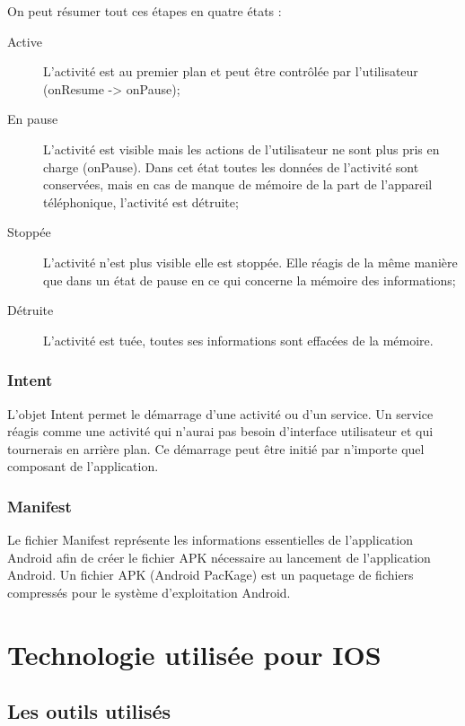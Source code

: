 On peut résumer tout ces étapes en quatre états :
\begin{description}
	\item[Active] L'activité est au premier plan et peut être contrôlée par l'utilisateur (onResume -> onPause);
	\item[En pause] L'activité est visible mais les actions de l'utilisateur ne sont plus pris en charge (onPause). Dans cet état toutes les données de l'activité sont conservées, mais en cas de manque de mémoire de la part de l'appareil téléphonique, l'activité est détruite;
	\item[Stoppée] L'activité n'est plus visible elle est stoppée. Elle réagis de la même manière que dans un état de pause en ce qui concerne la mémoire des informations;
	\item[Détruite] L'activité est tuée, toutes ses informations sont effacées de la mémoire.
\end{description}

\subsubsection{Intent}

L'objet Intent permet le démarrage d'une activité ou d'un service. Un service réagis comme une activité qui n'aurai pas besoin d'interface utilisateur et qui tournerais en arrière plan. Ce démarrage peut être initié par n'importe quel composant de l'application.

\subsubsection{Manifest}
Le fichier Manifest représente les informations essentielles de l'application Android afin de créer le fichier APK nécessaire au lancement de l'application Android. Un fichier APK (Android PacKage) est un paquetage de fichiers compressés pour le système d'exploitation Android.

\section{Technologie utilisée pour IOS}

\subsection{Les outils utilisés}

